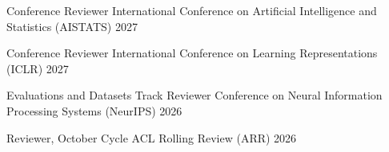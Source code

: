 
\begin{cvhonors}
  \cvhonor
    {Conference Reviewer}
    {International Conference on Artificial Intelligence and Statistics (AISTATS)}
    {}
    {2027}

  \cvhonor
    {Conference Reviewer}
    {International Conference on Learning Representations (ICLR)}
    {}
    {2027}

  \cvhonor
    {Evaluations and Datasets Track Reviewer}
    {Conference on Neural Information Processing Systems (NeurIPS)}
    {}
    {2026}

  \cvhonor
    {Reviewer, October Cycle}
    {ACL Rolling Review (ARR)}
    {}
    {2026}
\end{cvhonors}

